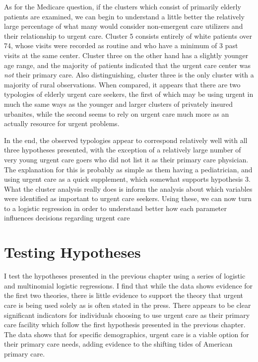 \documentclass[12pt,twoside]{reedthesis}
\begin{document}
  As for the Medicare question, if the clusters which consist of primarily
  elderly patients are examined, we can begin to understand a little
  better the relatively large percentage of what many would consider
  non-emergent care utilizers and their relationship to urgent care.
  Cluster 5 consists entirely of white patients over 74, whose visits were
  recorded as routine and who have a minimum of 3 past visits at the same
  center. Cluster three on the other hand has a slightly younger age
  range, and the majority of patients indicated that the urgent care
  center was \emph{not} their primary care. Also distinguishing, cluster
  three is the only cluster with a majority of rural observations. When
  compared, it appears that there are two typologies of elderly urgent
  care seekers, the first of which may be using urgent in much the same
  ways as the younger and larger clusters of privately insured urbanites,
  while the second seems to rely on urgent care much more as an actually
  resource for urgent problems.
  
  In the end, the observed typologies appear to correspond relatively well
  with all three hypotheses presented, with the exception of a relatively
  large number of very young urgent care goers who did not list it as
  their primary care physician. The explanation for this is probably as
  simple as them having a pediatrician, and using urgent care as a quick
  supplement, which somewhat supports hypothesis 3. What the cluster
  analysis really does is inform the analysis about which variables were
  identified as important to urgent care seekers. Using these, we can now
  turn to a logistic regression in order to understand better how each
  parameter influences decisions regarding urgent care
  
  \section{Testing Hypotheses}\label{testing-hypotheses}
  
  I test the hypotheses presented in the previous chapter using a series
  of logistic and multinomial logistic regressions. I find that while the
  data shows evidence for the first two theories, there is little evidence
  to support the theory that urgent care is being used solely as is often
  stated in the press. There appears to be clear significant indicators
  for individuals choosing to use urgent care as their primary care
  facility which follow the first hypothesis presented in the previous
  chapter. The data shows that for specific demographics, urgent care is a
  viable option for their primary care needs, adding evidence to the
  shifting tides of American primary care.
  
\end{document}
